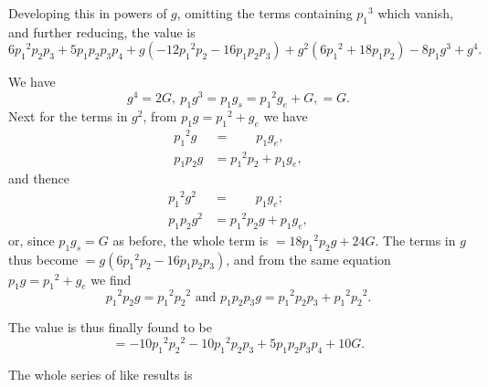 \documentclass[11pt,a4paper]{book}
\begin{document}
Developing this in powers of $g$, omitting the terms containing ${p_1}^3$ which vanish, and further reducing, the value is
\[
6{p_1}^2p_2p_3 + 5p_1p_2p_3p_4 + g(-12{p_1}^2p_2 - 16p_1p_2p_3) + g^2(6{p_1}^2 + 18p_1p_2) - 8p_1g^3 + g^4.
\]

We have
\[
g^4 = 2G,\ p_1g^3 = p_1g_s = {p_1}^2g_e + G, = G.
\]
Next for the terms in $g^2$, from $p_1g = {p_1}^2 + g_e$ we have
\begin{align*}
{p_1}^2g &= \qquad p_1g_e, \\
p_1p_2g &= {p_1}^2p_2 + p_1g_e,
\end{align*}
and thence
\begin{align*}
{p_1}^2g^2 &= \qquad p_1g_e; \\
p_1p_2g^2 &= {p_1}^2p_2g + p_1g_e,
\end{align*}
or, since $p_1g_s = G$ as before, the whole term is $= 18{p_1}^2p_2g + 24G$. The terms in $g$ thus become $= g(6{p_1}^2p_2 - 16p_1p_2p_3)$, and from the same equation $p_1g = {p_1}^2 + g_e$ we find
\[
{p_1}^2p_2g = {p_1}^2{p_2}^2 \text{ and } p_1p_2p_3g = {p_1}^2p_2p_3 + {p_1}^2{p_2}^2.
\]

The value is thus finally found to be
\[
= -10{p_1}^2{p_2}^2 - 10{p_1}^2p_2p_3 + 5p_1p_2p_3p_4 + 10G.
\]

The whole series of like results is
\end{document}

